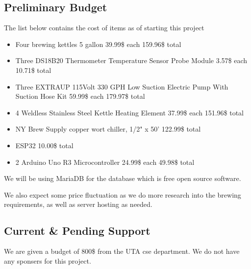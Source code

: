 

\subsection{Preliminary Budget}
The list below contains the cost of items as of starting this project
\begin{itemize}
	\item Four brewing kettles 5 gallon 39.99\$ each 159.96\$ total
	\item Three DS18B20 Thermometer Temperature Sensor Probe Module 3.57\$ each 10.71\$ total
	\item Three EXTRAUP 115Volt 330 GPH Low Suction Electric Pump With Suction Hose Kit 59.99\$ each 179.97\$ total
	\item 4 Weldless Stainless Steel Kettle Heating Element 37.99\$ each 151.96\$ total
	\item NY Brew Supply copper wort chiller, 1/2" x 50' 122.99\$ total
	\item ESP32 10.00\$ total
	\item 2 Arduino Uno R3 Microcontroller 24.99\$ each 49.98\$ total
\end{itemize}
We will be using MariaDB for the database which is free open source software. 

We also expect some price fluctuation as we do more research into the brewing requirements, as well as server hosting as needed.  

\subsection{Current \& Pending Support}
We are given a budget of 800\$ from the UTA cse department. We do not have any sponsers for this project.
